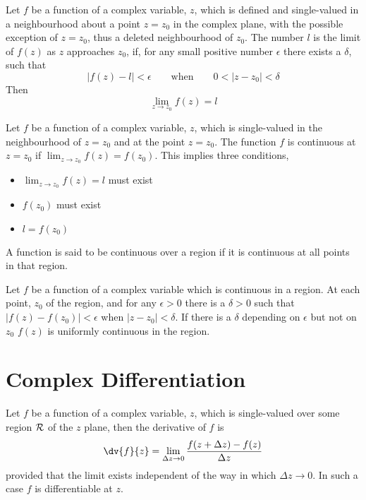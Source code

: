 \begin{definition}
  Let $f$ be a function of a complex variable, $z$, which is defined
  and single-valued in a neighbourhood about a point $z=z_0$ in the
  complex plane, with the possible exception of $z = z_0$, thus a
  deleted neighbourhood of $z_0$. The number $l$ is the limit of
  $f(z)$ as $z$ approaches $z_0$, if, for any small positive number
  $\epsilon$ there exists a $\delta$, such that \[ | f(z) - l | <
  \epsilon \qquad \text{when} \qquad 0 < |z - z_0 | <
  \delta \] Then \[ \lim_{z \to z_0} f(z) = l \]
\end{definition}
\begin{definition}[Continuity]
  Let $f$ be a function of a complex variable, $z$, which is
  single-valued in the neighbourhood of $z=z_0$ and at the point
  $z=z_0$. The function $f$ is continuous at $z=z_0$ if $\lim_{z \to
    z_0} f(z) = f(z_0)$. This implies three conditions,
  \begin{itemize}
  \item $\lim_{z \to z_0} f(z) = l$ must exist
  \item $f(z_0)$ must exist
  \item $l = f(z_0)$
  \end{itemize}
\end{definition}
\begin{definition}
  A function is said to be continuous over a region if it is
  continuous at all points in that region. 
\end{definition}
\begin{definition}
  Let $f$ be a function of a complex variable which is continuous in a
  region. At each point, $z_0$ of the region, and for any $\epsilon
  >0$ there is a $\delta >0$ such that $|f(z) - f(z_0)| < \epsilon$
  when $|z - z_0| < \delta$. If there is a $\delta$ depending on
  $\epsilon$ but not on $z_0$ $f(z)$ is uniformly continuous in the
  region.
\end{definition}

\section{Complex Differentiation}
\label{sec:complexdiff}

\begin{definition}[Differentiation]
  Let $f$ be a function of a complex variable, $z$, which is
  single-valued over some region ${\cal R}$ of the $z$ plane, then the
  derivative of $f$ is
  \[ \dv{f}{z} = \lim_{\Delta z \to 0} \frac{f(z + \Delta z) -
    f(z)}{\Delta z} \] provided that the limit exists independent of
  the way in which $\Delta z \to 0$. In such a case $f$ is
  differentiable at $z$.
\end{definition}

